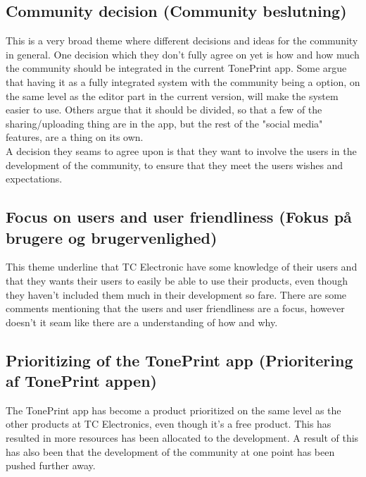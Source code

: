 \subsection*{Community decision (Community beslutning)} 
\label{ThemeCommunityDecision}
This is a very broad theme where different decisions and ideas for the community in general. One decision which they don't fully agree on yet is how and how much the community should be integrated in the current TonePrint app. Some argue that having it as a fully integrated system with the community being a option, on the same level as the editor part in the current version, will make the system easier to use. Others argue that it should be divided, so that a few of the sharing/uploading thing are in the app, but the rest of the "social media" features, are a thing on its own. \\
A decision they seams to agree upon is that they want to involve the users in the development of the community, to ensure that they meet the users wishes and expectations. 

\subsection*{Focus on users and user friendliness (Fokus på brugere og brugervenlighed)} 
\label{ThemeFocusOnUsersAndUserFriendliness}
This theme underline that TC Electronic have some knowledge of their users and that they wants their users to easily be able to use their products, even though they haven't included them much in their development so fare. There are some comments mentioning that the users and user friendliness are a focus, however doesn't it seam like there are a understanding of how and why.

\subsection*{Prioritizing of the TonePrint app (Prioritering af TonePrint appen)} 
\label{ThemePrioritizingOfTheTonePrintApp}
The TonePrint app has become a product prioritized on the same level as the other products at TC Electronics, even though it's a free product. This has resulted in more resources has been allocated to the development. A result of this has also been that the development of the community at one point has been pushed further away.

